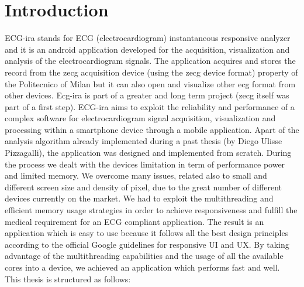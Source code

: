 
\chapter{Introduction}
\label{Chapter1} 

ECG-ira stands for ECG (electrocardiogram) instantaneous responsive analyzer and it is an android application developed for the acquisition, visualization and analysis of the electrocardiogram signals. The application acquires and stores  the record from the zecg acquisition device  (using the zecg device format) property of the Politecnico of Milan but it can also open and visualize other ecg format from other  devices. Ecg-ira is part of a greater and long term project (zecg itself was part of a first step). ECG-ira aims to exploit the reliability and performance of a complex software for electrocardiogram signal acquisition,  visualization  and processing within a smartphone device through a mobile application. Apart of the analysis algorithm already implemented during a past thesis (by Diego Ulisse Pizzagalli), the application was designed and implemented from scratch. During the process we dealt with the devices limitation in term of performance power and limited memory. We overcome many issues, related also to small and different screen size and density of pixel, due to the great number of different devices currently on the market. We had to exploit the multithreading and efficient memory usage strategies in order to achieve responsiveness and fulfill the medical requirement for an ECG compliant application. The result is an application which is easy to use because it follows all the best design principles according to the official Google guidelines for responsive UI and UX. By taking advantage of the multithreading capabilities and the usage of all the available cores into a device, we achieved an application which performs fast and well.\\
This thesis is structured as follows: 
